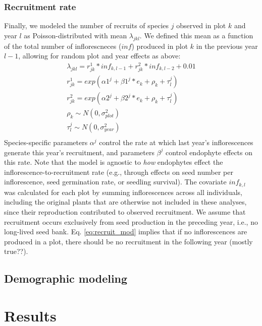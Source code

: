 \documentclass[11pt]{article}
\begin{document}
\subsubsection*{Recruitment rate}
Finally, we modeled the number of recruits of species $j$ observed in plot $k$ and year $l$ as Poisson-distributed with mean $\lambda_{jkl}$. 
We defined this mean as a function of the total number of inflorescneces ($inf$) produced in plot $k$ in the previous year $l-1$, allowing for random plot and year effects as above:
\begin{align*}
	\lambda_{jkl} = r^{1}_{jk} * inf_{k,l-1} + r^{2}_{jk} * inf_{k,l-2} + 0.01\\
	r^{1}_{jk} = exp(\alpha1^{j} + \beta1^{j}*e_k + \rho_k + \tau^{j}_{l})\\
	r^{2}_{jk} = exp(\alpha2^{j} + \beta2^{j}*e_k + \rho_k + \tau^{j}_{l})\\	\rho_k \sim N(0,\sigma^2_{plot})\\
	\tau^{j}_{l} \sim N(0,\sigma^2_{year})\\
\end{align*}
Species-specific parameters $\alpha^{j}$ control the rate at which last year's inflorescences generate this year's recruitment, and parameters $\beta^{j}$ control endophyte effects on this rate. 
Note that the model is agnostic to \emph{how} endophytes effect the inflorescence-to-recruitment rate (e.g., through effects on seed number per inflorescence, seed germination rate, or seedling survival). 
The covariate $inf_{k,l}$ was calculated for each plot by summing inflorescences across all individuals, including the original plants that are otherwise not included in these analyses, since their reproduction contributed to observed recruitment. 
We assume that recruitment occurs exclusively from seed production in the preceding year, i.e., no long-lived seed bank. 
Eq. \ref{eq:recruit_mod} implies that if no inflorescences are produced in a plot, there should be no recruitment in the following year (mostly true??). 

\subsection*{Demographic modeling}

\section*{Results}
\end{document}
